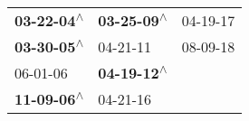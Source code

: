 \begin{supertabular}{lll}
 \textbf{03-22-04\textsuperscript{$\wedge$}} &  \textbf{03-25-09\textsuperscript{$\wedge$}} &  04-19-17\textsuperscript{} \\
 \textbf{03-30-05\textsuperscript{$\wedge$}} &                   04-21-11\textsuperscript{} &  08-09-18\textsuperscript{} \\
                  06-01-06\textsuperscript{} &  \textbf{04-19-12\textsuperscript{$\wedge$}} &                             \\
 \textbf{11-09-06\textsuperscript{$\wedge$}} &                   04-21-16\textsuperscript{} &                             \\
\end{supertabular}
